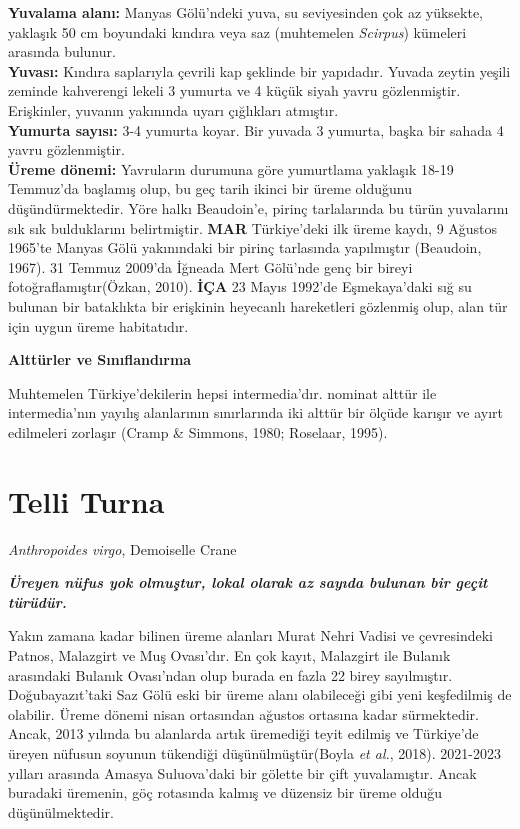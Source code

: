 \documentclass[
  a4paper,
  DIV=11,
  numbers=noendperiod]{scrreprt}
\begin{document}
\textbf{Yuvalama alanı:} Manyas Gölü'ndeki yuva, su seviyesinden çok az
yüksekte, yaklaşık 50 cm boyundaki kındıra veya saz (muhtemelen
\emph{Scirpus}) kümeleri arasında bulunur.\\
\textbf{Yuvası:} Kındıra saplarıyla çevrili kap şeklinde bir yapıdadır.
Yuvada zeytin yeşili zeminde kahverengi lekeli 3 yumurta ve 4 küçük
siyah yavru gözlenmiştir. Erişkinler, yuvanın yakınında uyarı çığlıkları
atmıştır.\\
\textbf{Yumurta sayısı:} 3-4 yumurta koyar. Bir yuvada 3 yumurta, başka
bir sahada 4 yavru gözlenmiştir.\\
\textbf{Üreme dönemi:} Yavruların durumuna göre yumurtlama yaklaşık
18-19 Temmuz'da başlamış olup, bu geç tarih ikinci bir üreme olduğunu
düşündürmektedir. Yöre halkı Beaudoin'e, pirinç tarlalarında bu türün
yuvalarını sık sık bulduklarını belirtmiştir. \textbf{MAR} Türkiye'deki
ilk üreme kaydı, 9 Ağustos 1965'te Manyas Gölü yakınındaki bir pirinç
tarlasında yapılmıştır (Beaudoin, 1967). 31 Temmuz 2009'da İğneada Mert
Gölü'nde genç bir bireyi fotoğraflamıştır(Özkan, 2010). \textbf{İÇA} 23
Mayıs 1992'de Eşmekaya'daki sığ su bulunan bir bataklıkta bir erişkinin
heyecanlı hareketleri gözlenmiş olup, alan tür için uygun üreme
habitatıdır.

\textbf{Alttürler ve Sınıflandırma}

Muhtemelen Türkiye'dekilerin hepsi intermedia'dır. nominat alttür ile
intermedia'nın yayılış alanlarının sınırlarında iki alttür bir ölçüde
karışır ve ayırt edilmeleri zorlaşır (Cramp \& Simmons, 1980; Roselaar,
1995).

\section{Telli Turna}\label{telli-turna}

\emph{Anthropoides virgo}, Demoiselle Crane

\textbf{\emph{Üreyen nüfus yok olmuştur, lokal olarak az sayıda bulunan
bir geçit türüdür.}}

Yakın zamana kadar bilinen üreme alanları Murat Nehri Vadisi ve
çevresindeki Patnos, Malazgirt ve Muş Ovası'dır. En çok kayıt, Malazgirt
ile Bulanık arasındaki Bulanık Ovası'ndan olup burada en fazla 22 birey
sayılmıştır. Doğubayazıt'taki Saz Gölü eski bir üreme alanı olabileceği
gibi yeni keşfedilmiş de olabilir. Üreme dönemi nisan ortasından ağustos
ortasına kadar sürmektedir. Ancak, 2013 yılında bu alanlarda artık
üremediği teyit edilmiş ve Türkiye'de üreyen nüfusun soyunun tükendiği
düşünülmüştür(Boyla \emph{et al.}, 2018). 2021-2023 yılları arasında
Amasya Suluova'daki bir gölette bir çift yuvalamıştır. Ancak buradaki
üremenin, göç rotasında kalmış ve düzensiz bir üreme olduğu
düşünülmektedir.
\end{document}
